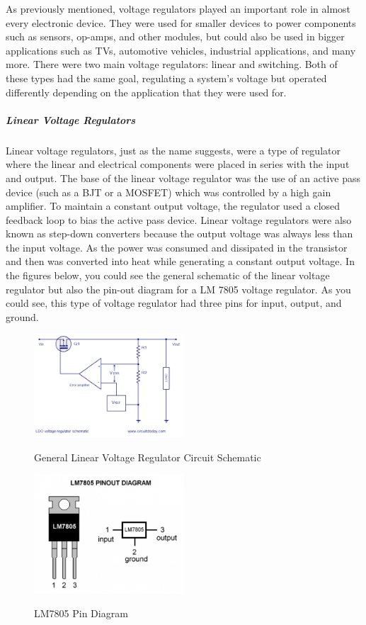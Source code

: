 As previously mentioned, voltage regulators played an important role in almost every electronic device. They were used for smaller devices to power components such as sensors, op-amps, and other modules, but could also be used in bigger applications such as TVs, automotive vehicles, industrial applications, and many more. There were two main voltage regulators: linear and switching. Both of these types had the same goal, regulating a system’s voltage but operated differently depending on the application that they were used for.
\subparagraph{Linear Voltage Regulators}
Linear voltage regulators, just as the name suggests, were a type of regulator where the linear and electrical components were placed in series with the input and output. The base of the linear voltage regulator was the use of an active pass device (such as a BJT or a MOSFET) which was controlled by a high gain amplifier. To maintain a constant output voltage, the regulator used a closed feedback loop to bias the active pass device. Linear voltage regulators were also known as step-down converters because the output voltage was always less than the input voltage. As the power was consumed and dissipated in the transistor and then was converted into heat while generating a constant output voltage. In the figures below, you could see the general schematic of the linear voltage regulator but also the pin-out diagram for a LM 7805 voltage regulator. As you could see, this type of voltage regulator had three pins for input, output, and ground.
\begin{figure}[H]
    \caption{General Linear Voltage Regulator Circuit Schematic}
    \centering
    \includegraphics[width=0.5\textwidth]{images/Gen_Linear_Voltage_Regulator.png}
    \label{fig:general-linear-voltage-regulator}
\end{figure}
\begin{figure}[H]
    \caption{LM7805 Pin Diagram}
    \centering
    \includegraphics[width=0.5\textwidth]{images/LM7805_pin_diagram.png}
    \label{fig:LM7805-pin-diagram}
\end{figure}
